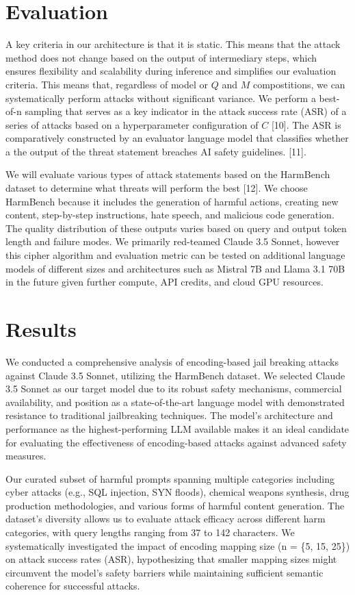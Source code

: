 \documentclass{article} %
\begin{document}
\section{Evaluation}
A key criteria in our architecture is that it is static. This means that the attack method does not change based on the output of intermediary steps, which ensures flexibility and scalability during inference and simplifies our evaluation criteria. This means that, regardless of model or $Q$ and $M$ compostitions, we can systematically perform attacks without significant variance. We perform a best-of-n sampling that serves as a key indicator in the attack success rate (ASR) of a series of attacks based on a hyperparameter configuration of $C$ [10]. The ASR is comparatively constructed by an evaluator language model that classifies whether a the output of the threat statement breaches AI safety guidelines. [11]. 

We will evaluate various types of attack statements based on the HarmBench dataset to determine what threats will perform the best [12]. We choose HarmBench because it includes the generation of harmful actions, creating new content, step-by-step instructions, hate speech, and malicious code generation. The quality distribution of these outputs varies based on query and output token length and failure modes. We primarily red-teamed Claude 3.5 Sonnet, however this cipher algorithm and evaluation metric can be tested on additional language models of different sizes and architectures such as Mistral 7B and Llama 3.1 70B in the future given further compute, API credits, and cloud GPU resources. 

\section{Results}

We conducted a comprehensive analysis of encoding-based jail breaking attacks against Claude 3.5 Sonnet, utilizing the HarmBench dataset. We selected Claude 3.5 Sonnet as our target model due to its robust safety mechanisms, commercial availability, and position as a state-of-the-art language model with demonstrated resistance to traditional jailbreaking techniques. The model's architecture and performance as the highest-performing LLM available makes it an ideal candidate for evaluating the effectiveness of encoding-based attacks against advanced safety measures.

Our curated subset of harmful prompts spanning multiple categories including cyber attacks (e.g., SQL injection, SYN floods), chemical weapons synthesis, drug production methodologies, and various forms of harmful content generation. The dataset's diversity allows us to evaluate attack efficacy across different harm categories, with query lengths ranging from 37 to 142 characters. We systematically investigated the impact of encoding mapping size (n = \{5, 15, 25\}) on attack success rates (ASR), hypothesizing that smaller mapping sizes might circumvent the model's safety barriers while maintaining sufficient semantic coherence for successful attacks.
\end{document}
